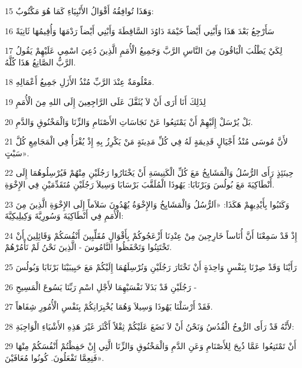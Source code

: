 \par 15 وَهَذَا تُوافِقُهُ أَقْوَالُ الأَنْبِيَاءِ كَمَا هُوَ مَكْتُوبٌ:
\par 16 سَأَرْجِعُ بَعْدَ هَذَا وَأَبْنِي أَيْضاً خَيْمَةَ دَاوُدَ السَّاقِطَةَ وَأَبْنِي أَيْضاً رَدْمَهَا وَأُقِيمُهَا ثَانِيَةً
\par 17 لِكَيْ يَطْلُبَ الْبَاقُونَ مِنَ النَّاسِ الرَّبَّ وَجَمِيعُ الْأُمَمِ الَّذِينَ دُعِيَ اسْمِي عَلَيْهِمْ يَقُولُ الرَّبُّ الصَّانِعُ هَذَا كُلَّهُ.
\par 18 مَعْلُومَةٌ عِنْدَ الرَّبِّ مُنْذُ الأَزَلِ جَمِيعُ أَعْمَالِهِ.
\par 19 لِذَلِكَ أَنَا أَرَى أَنْ لاَ يُثَقَّلَ عَلَى الرَّاجِعِينَ إِلَى اللهِ مِنَ الْأُمَمِ
\par 20 بَلْ يُرْسَلْ إِلَيْهِمْ أَنْ يَمْتَنِعُوا عَنْ نَجَاسَاتِ الأَصْنَامِ وَالزِّنَا وَالْمَخْنُوقِ وَالدَّمِ.
\par 21 لأَنَّ مُوسَى مُنْذُ أَجْيَالٍ قَدِيمَةٍ لَهُ فِي كُلِّ مَدِينَةٍ مَنْ يَكْرِزُ بِهِ إِذْ يُقْرَأُ فِي الْمَجَامِعِ كُلَّ سَبْتٍ».
\par 22 حِينَئِذٍ رَأَى الرُّسُلُ وَالْمَشَايِخُ مَعَ كُلِّ الْكَنِيسَةِ أَنْ يَخْتَارُوا رَجُلَيْنِ مِنْهُمْ فَيُرْسِلُوهُمَا إِلَى أَنْطَاكِيَةَ مَعَ بُولُسَ وَبَرْنَابَا: يَهُوذَا الْمُلَقَّبَ بَرْسَابَا وَسِيلاَ رَجُلَيْنِ مُتَقَدِّمَيْنِ فِي الإِخْوَةِ.
\par 23 وَكَتَبُوا بِأَيْدِيهِمْ هَكَذَا: «اَلرُّسُلُ وَالْمَشَايِخُ وَالإِخْوَةُ يُهْدُونَ سَلاَماً إِلَى الإِخْوَةِ الَّذِينَ مِنَ الْأُمَمِ فِي أَنْطَاكِيَةَ وَسُورِيَّةَ وَكِيلِيكِيَّةَ:
\par 24 إِذْ قَدْ سَمِعْنَا أَنَّ أُنَاساً خَارِجِينَ مِنْ عِنْدِنَا أَزْعَجُوكُمْ بِأَقْوَالٍ مُقَلِّبِينَ أَنْفُسَكُمْ وَقَائِلِينَ أَنْ تَخْتَتِنُوا وَتَحْفَظُوا النَّامُوسَ - الَّذِينَ نَحْنُ لَمْ نَأْمُرْهُمْ.
\par 25 رَأَيْنَا وَقَدْ صِرْنَا بِنَفْسٍ وَاحِدَةٍ أَنْ نَخْتَارَ رَجُلَيْنِ وَنُرْسِلَهُمَا إِلَيْكُمْ مَعَ حَبِيبَيْنَا بَرْنَابَا وَبُولُسَ
\par 26 رَجُلَيْنِ قَدْ بَذَلاَ نَفْسَيْهِمَا لأَجْلِ اسْمِ رَبِّنَا يَسُوعَ الْمَسِيحِ -
\par 27 فَقَدْ أَرْسَلْنَا يَهُوذَا وَسِيلاَ وَهُمَا يُخْبِرَانِكُمْ بِنَفْسِ الْأُمُورِ شِفَاهاً.
\par 28 لأَنَّهُ قَدْ رَأَى الرُّوحُ الْقُدُسُ وَنَحْنُ أَنْ لاَ نَضَعَ عَلَيْكُمْ ثِقْلاً أَكْثَرَ غَيْرَ هَذِهِ الأَشْيَاءِ الْوَاجِبَةِ:
\par 29 أَنْ تَمْتَنِعُوا عَمَّا ذُبِحَ لِلأَصْنَامِ وَعَنِ الدَّمِ وَالْمَخْنُوقِ وَالزِّنَا الَّتِي إِنْ حَفِظْتُمْ أَنْفُسَكُمْ مِنْهَا فَنِعِمَّا تَفْعَلُونَ. كُونُوا مُعَافَيْنَ».
